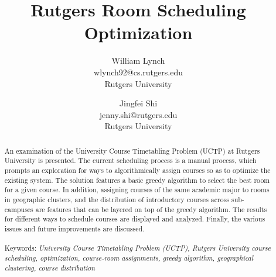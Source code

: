 \documentclass[12pt]{article}
\title{Rutgers Room Scheduling Optimization}
\author {William Lynch \\ wlynch92@cs.rutgers.edu \\ Rutgers University
	\and Jingfei Shi \\ jenny.shi@rutgers.edu \\ Rutgers University}
\begin{document}
\maketitle
\begin{abstract}
An examination of the University Course Timetabling Problem (UCTP) at Rutgers University is presented. The current scheduling process is a manual process, which prompts an exploration for ways to algorithmically assign courses so as to optimize the existing system. The solution features a basic greedy algorithm to select the best room for a given course. In addition, assigning courses of the same academic major to rooms in geographic clusters, and the distribution of introductory courses across sub-campuses are features that can be layered on top of the greedy algorithm. The results for different ways to schedule courses are displayed and analyzed. Finally, the various issues and future improvements are discussed.
\\\\
Keywords: \emph{University Course Timetabling Problem (UCTP), Rutgers University course scheduling, optimization, course-room assignments, greedy algorithm, geographical clustering, course distribution}
\end{abstract}
\end{document}
